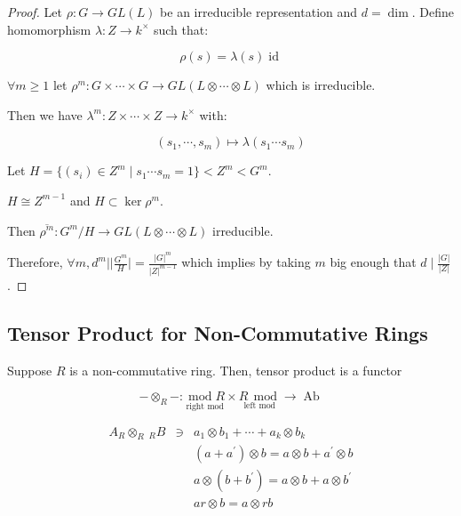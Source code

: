 \documentclass{article}
\theoremstyle{definition}
\begin{document}
\begin{proof}
    Let \(\rho : G \to GL(L)\) be an irreducible representation and \(d = \dim\). Define homomorphism \(\lambda : Z \to k^\times\) such that:

    \[
        \rho (s) = \lambda (s) \operatorname{id}
    \]

    \(\forall m \geq 1\) let \(\rho^m : G \times \cdots \times G \to GL(L \otimes \cdots \otimes L)\) which is irreducible.

    Then we have \(\lambda^m : Z \times \cdots \times Z \to k^\times\) with:

    \[
        (s_1, \cdots , s_m) \mapsto \lambda (s_1 \cdots s_m)
    \]

    Let \(H = \{ (s_i) \in Z^m \mid s_1 \cdots s_m = 1 \} < Z^m < G^m\).

    \(H \cong Z^{m-1}\) and \(H \subset \ker \rho^m\).

    Then \(\overline{\rho^m} : G^m / H \to GL(L \otimes \cdots \otimes L)\) irreducible.

    Therefore, \(\forall m, d^m \mid \vert \frac{G^m}{H} \vert = \frac{\vert G \vert^m}{\vert Z \vert^{m-1}}\) which implies by taking \(m\) big enough that \(d \mid \frac{\vert G \vert}{\vert Z \vert}\).  

\end{proof}

\subsection*{Tensor Product for Non-Commutative Rings}

Suppose \(R\) is a non-commutative ring. Then, tensor product is a functor 

\[
    - \otimes_R - : \underset{\text{right mod}}{\operatorname{mod} R} \times \underset{\text{left mod}}{R\,\operatorname{mod}} \to \operatorname{Ab}  
\]

\[
    \begin{array}{ccc}
        A_R \otimes _R \,_R B & \ni &  a_1 \otimes b_1 + \cdots + a_k \otimes b_k \\
         &  &  (a + a^{\prime}) \otimes b = a \otimes b + a^{\prime} \otimes b \\
         &  &  a \otimes (b + b^{\prime}) = a \otimes b + a \otimes b^{\prime} \\
         &  &  ar \otimes b = a \otimes rb \\
    \end{array}
\]
\end{document}
